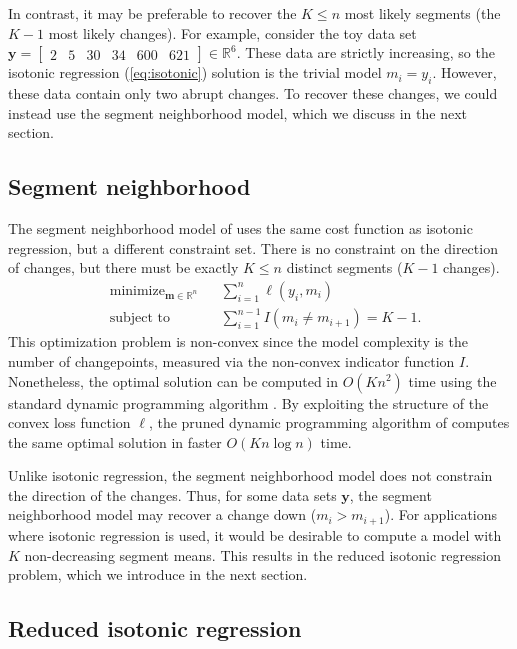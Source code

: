 \documentclass{article}
\DeclareMathOperator*{\minimize}{minimize}
\newcommand{\RR}{\mathbb R}
\begin{document}
In contrast, it may be preferable to recover the $K\leq n$ most likely
segments (the $K-1$ most likely changes). For example, consider the
toy data set $\mathbf y= \left[
\begin{array}{cccccc}
  2 & 5 & 30 & 34 & 600 & 621
\end{array}
\right] \in\RR^6$. These data are strictly increasing, so the isotonic
regression (\ref{eq:isotonic}) solution is the trivial model
$m_i=y_i$. However, these data contain only two abrupt changes. To
recover these changes, we could instead use the segment
neighborhood model, which we discuss in the next section.

\subsection{Segment neighborhood}

The segment neighborhood model of \citet{segment-neighborhood} uses
the same cost function as isotonic regression, but a different
constraint set. There is no constraint on the direction of changes,
but there must be exactly $K\leq n$ distinct segments ($K-1$ changes).
\begin{align}
  \label{eq:optimal_segment_neighborhood}
  &\minimize_{\mathbf m\in\RR^n} && 
  \sum_{i=1}^n \ell(y_i, m_i)\\
  &\text{subject to} && \sum_{i=1}^{n-1} I(m_i \neq m_{i+1}) = K-1.
  \nonumber
\end{align}
This optimization problem is non-convex since the model complexity is
the number of changepoints, measured via the non-convex indicator
function $I$. Nonetheless, the optimal solution can be computed in
$O(K n^2)$ time using the standard dynamic programming algorithm
\citep{segment-neighborhood}. By exploiting the structure of the
convex loss function $\ell$, the pruned dynamic programming algorithm
of \citet{pruned-dp} computes the same optimal solution in faster
$O(K n \log n)$ time.

Unlike isotonic regression, the segment neighborhood model does not
constrain the direction of the changes. Thus, for some data sets
$\mathbf y$, the segment neighborhood model may recover a change down
($m_i > m_{i+1}$). For applications where isotonic regression is used,
it would be desirable to compute a model with $K$ non-decreasing
segment means. This results in the reduced isotonic regression
problem, which we introduce in the next section.

\subsection{Reduced isotonic regression}
\end{document}
